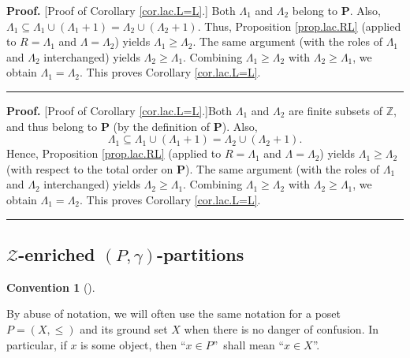\documentclass[numbers=enddot,12pt,final,onecolumn,notitlepage]{scrartcl}%
\theoremstyle{definition}
\newtheorem{conv}[theo]{Convention}
\newenvironment{convention}[1][]
{\begin{conv}[#1]\begin{leftbar}}
{\end{leftbar}\end{conv}}
\newenvironment{proof}[1][Proof]{\noindent\textbf{#1.} }{\ \rule{0.5em}{0.5em}}
\newenvironment{convention}[1][Convention]{\noindent\textbf{#1.} }{\ \rule{0.5em}{0.5em}}
\newenvironment{verlong}{}{}
\newenvironment{vershort}{}{}
\begin{document}
\begin{vershort}
\begin{proof}
[Proof of Corollary \ref{cor.lac.L=L}.] Both $\Lambda_{1}$ and $\Lambda_{2}$
belong to $\mathbf{P}$. Also, $\Lambda_{1}\subseteq\Lambda_{1}\cup\left(
\Lambda_{1}+1\right)  =\Lambda_{2}\cup\left(  \Lambda_{2}+1\right)  $. Thus,
Proposition \ref{prop.lac.RL} (applied to $R=\Lambda_{1}$ and $\Lambda
=\Lambda_{2}$) yields $\Lambda_{1}\geq\Lambda_{2}$. The same argument (with
the roles of $\Lambda_{1}$ and $\Lambda_{2}$ interchanged) yields $\Lambda
_{2}\geq\Lambda_{1}$. Combining $\Lambda_{1}\geq\Lambda_{2}$ with $\Lambda
_{2}\geq\Lambda_{1}$, we obtain $\Lambda_{1}=\Lambda_{2}$. This proves
Corollary \ref{cor.lac.L=L}.
\end{proof}
\end{vershort}

\begin{verlong}


\begin{proof}
[Proof of Corollary \ref{cor.lac.L=L}.]Both $\Lambda_{1}$ and $\Lambda_{2}$
are finite subsets of $\mathbb{Z}$, and thus belong to $\mathbf{P}$ (by the
definition of $\mathbf{P}$). Also,
\[
\Lambda_{1}\subseteq\Lambda_{1}\cup\left(  \Lambda_{1}+1\right)  =\Lambda
_{2}\cup\left(  \Lambda_{2}+1\right)  .
\]
Hence, Proposition \ref{prop.lac.RL} (applied to $R=\Lambda_{1}$ and
$\Lambda=\Lambda_{2}$) yields $\Lambda_{1}\geq\Lambda_{2}$ (with respect to
the total order on $\mathbf{P}$). The same argument (with the roles of
$\Lambda_{1}$ and $\Lambda_{2}$ interchanged) yields $\Lambda_{2}\geq
\Lambda_{1}$. Combining $\Lambda_{1}\geq\Lambda_{2}$ with $\Lambda_{2}%
\geq\Lambda_{1}$, we obtain $\Lambda_{1}=\Lambda_{2}$. This proves Corollary
\ref{cor.lac.L=L}.
\end{proof}
\end{verlong}

\subsection{\label{subsect.Zenri.gen}$\mathcal{Z}$-enriched $\left(
P,\gamma\right)  $-partitions}

\begin{convention}
By abuse of notation, we will often use the same notation for a poset
$P=\left(  X,\leq\right)  $ and its ground set $X$ when there is no danger of
confusion. In particular, if $x$ is some object, then \textquotedblleft$x\in
P$\textquotedblright\ shall mean \textquotedblleft$x\in X$\textquotedblright.
\end{convention}
\end{document}
